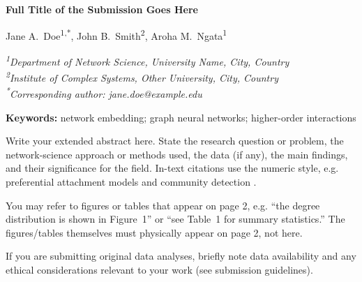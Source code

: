 \documentclass[10pt]{article}
\newcommand{\absTitle}[1]{{\noindent\Large\bfseries #1\par\medskip}}
\newcommand{\absAuthors}[1]{{\noindent\normalsize #1\par\smallskip}}
\newcommand{\absAffil}[1]{{\noindent\small\itshape #1\par\medskip}}
\newcommand{\affilnum}[1]{\textsuperscript{#1}}
\newcommand{\absKeywords}[1]{{\noindent\small\textbf{Keywords:} #1\par\medskip}}
\begin{document}

\absTitle{Full Title of the Submission Goes Here}

\absAuthors{Jane A.~Doe\affilnum{1,*}, John B.~Smith\affilnum{2}, Aroha M.~Ngata\affilnum{1}}
\absAffil{\affilnum{1}Department of Network Science, University Name, City, Country \\
\affilnum{2}Institute of Complex Systems, Other University, City, Country \\
\affilnum{*}Corresponding author: jane.doe@example.edu}

\absKeywords{network embedding; graph neural networks; higher-order interactions}
\bigskip


Write your extended abstract here. State the research question or problem,
the network-science approach or methods used, the data (if any), the main
findings, and their significance for the field. In-text citations use the
numeric style, e.g. preferential attachment models \citep{barabasi1999emergence}
and community detection \citep{fortunato2010community}.

You may refer to figures or tables that appear on page 2, e.g. ``the
degree distribution is shown in Figure~1'' or ``see Table~1 for summary
statistics.'' The figures/tables themselves must physically appear on
page 2, not here.

If you are submitting original data analyses, briefly note data availability
and any ethical considerations relevant to your work (see submission
guidelines).

\clearpage
%
\end{document}
